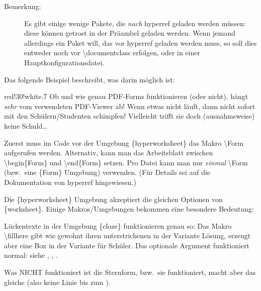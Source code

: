 \documentclass[hyperworksheet]{drcschool}
\newcommand*{\cs}[1]{\textup{\ttfamily\textbackslash#1}}                   %
\newcommand*{\pkg}[1]{\textup{\ttfamily#1}}                                %
\newcommand*{\env}[1]{\textup{\ttfamily\{#1\}}}                            %
\begin{document}
\begin{description}
\item[Bemerkung:]
Es gibt einige wenige Pakete, die \emph{nach} \pkg{hyperref} geladen werden müssen:
diese können getrost in der Präambel geladen werden. Wenn jemand allerdings ein Paket
will, das vor \pkg{hyperref} geladen werden muss, so soll dies entweder noch vor
\cs{documentclass} erfolgen, oder in einer Hauptkonfigurationsdatei.
\end{description}

Das folgende Beispiel beschreibt, was darin möglich ist:

\Form  %
\begin{hyperworksheet}

\begin{center}
\begin{colorminipage}{red!30!white}{.7\linewidth}
Ob und wie genau PDF-Forms funktionieren (oder nicht), hängt \emph{sehr} vom
verwendeten PDF-Viewer ab! Wenn etwas nicht läuft, dann nicht sofort mit den
Schülern/Studenten schimpfen! Vielleicht trifft sie doch (ausnahmsweise) keine
Schuld\ldots
\end{colorminipage}
\end{center}

\noindent
Zuerst muss im Code vor der Umgebung \env{hyperworksheet} das Makro \cs{Form}
aufgerufen werden. Alternativ, kann man das Arbeitsblatt zwischen
\cs{begin\{Form\}} und \cs{end\{Form\}} setzen. Pro Datei kann man nur \emph{einmal}
\cs{Form} (bzw.~eine \env{Form} Umgebung) verwenden. (Für Details sei auf die Dokumentation
von \pkg{hyperref} hingewiesen.)

Die \env{hyperworksheet} Umgebung akzeptiert die gleichen Optionen von \env{worksheet}.
Einige Makros/Umgebungen bekommen eine besondere Bedeutung:

\exercise[Lückentexte]
\begin{cloze}
Lückentexte in der Umgebung \env{cloze} funktionieren genau so: Das Makro \cs{fillhere}
gibt wie gewohnt ihren unterstrichenen  in der Variante  Lösung,
erzeugt aber eine  Box in der Variante für Schüler.
Das optionale Argument funktioniert normal: siehe , ,
.

Was NICHT funktioniert ist die Sternform, bzw.~sie funktioniert, macht aber das gleiche
(also keine Linie bis zum ).
\end{cloze}


\end{hyperworksheet}
\end{document}
